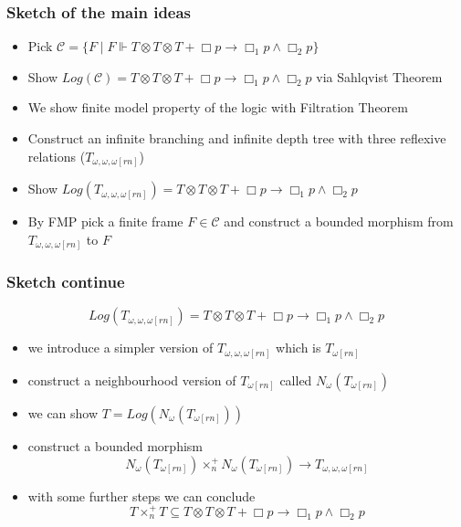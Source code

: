 \documentclass[hyperref={pdfpagelabels=false},t,10pt]{beamer}
\begin{document}
\begin{frame}
  \frametitle{Sketch of the main ideas}
  \begin{itemize}
    \item Pick $\mathcal{C} = \{F \mid F \Vdash T \otimes T\otimes T + \Box p \rightarrow \Box_1 p \land \Box_2 p\}$  \pause
    \item Show $Log(\mathcal{C}) = T \otimes T \otimes T + \Box p \rightarrow \Box_1 p \land \Box_2 p$ via Sahlqvist Theorem
    \item We show finite model property of the logic with Filtration Theorem \pause
    \item Construct an infinite branching and infinite depth tree with three reflexive relations ($T_{\omega,\omega,\omega[rn]}$) \pause
    \item Show $Log(T_{\omega,\omega,\omega[rn]}) = T \otimes T \otimes T+ \Box p \rightarrow \Box_1 p \land \Box_2 p$
    \item By FMP pick a finite frame $F \in \mathcal{C}$ and construct a bounded morphism from $T_{\omega,\omega,\omega[rn]}$ to $F$
  \end{itemize}

\end{frame}

\begin{frame}
  \frametitle{Sketch continue}
  $$Log(T_{\omega,\omega,\omega[rn]}) = T \otimes T \otimes T+ \Box p \rightarrow \Box_1 p \land \Box_2 p$$
  \begin{itemize}
    \item we introduce a simpler version of $T_{\omega,\omega,\omega[rn]}$ which is $T_{\omega[rn]}$ \pause
    \item construct a neighbourhood version of $T_{\omega[rn]}$ called $N_\omega(T_{\omega[rn]})$ 
    \item we can show $T = Log(N_\omega(T_{\omega[rn]}))$ \pause
    \item construct a bounded morphism $$N_\omega(T_{\omega[rn]}) \times_n^+ N_\omega(T_{\omega[rn]}) \rightarrow T_{\omega,\omega,\omega[rn]}$$
    \item with some further steps we can conclude $$T \times_n^+ T \subseteq T \otimes T \otimes T + \Box p \rightarrow \Box_1 p \land \Box_2 p$$
  \end{itemize}

\end{frame}  
\end{document}
